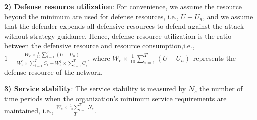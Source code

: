 \documentclass[lettersize,journal]{IEEEtran}
\begin{document}
\textbf{2) Defense resource utilization}: For convenience, we assume the resource beyond the minimum are used for defense resources, i.e., $U-U_{n}$, and we assume that the defender expends all defensive resources to defend against the attack without strategy guidance. Hence, defense resource utilization is the ratio between the defensive resource and resource consumption,i.e., $1-\frac{W_c\times\frac{1}{10} \sum_{i=1}^{T}(U-U_{n})}{W_c^r\times\sum_{i=1}^{T}C_r+W_c^q\times\sum_{i=1}^{T}C_q}$, where $W_c\times\frac{1}{10} \sum_{i=1}^{T}(U-U_{n})$ represents the defense resource of the network. \par
\textbf{3) Service stability}: The service stability is measured by $N_s$ the number of time periods when the organization's minimum service requirements are maintained, i.e., $\frac{W_c\times\frac{1}{10} \sum_{i=1}^{T}N_s}{T}$.\par
\end{document}
